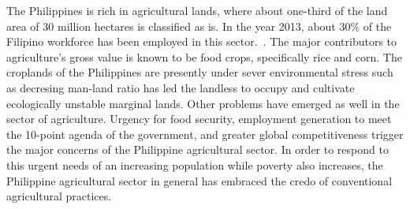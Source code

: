 The Philippines is rich in agricultural lands, where about one-third of the land area of 30 million hectares is classified as is. In the year 2013, about 30\% of the Filipino workforce has been employed in this sector.~\cite{WorldBank}. The major contributors to agriculture's gross value is known to be food crops, specifically rice and corn. The croplands of the Philippines are presently under sever environmental stress such as decresing man-land ratio has led the landless to occupy and cultivate ecologically unstable marginal lands. Other problems have emerged as well in the sector of agriculture. Urgency for food security, employment generation to meet the 10-point agenda of the government, and greater global competitiveness trigger the major concerns of the Philippine agricultural sector. In order to respond to this urgent needs of an increasing population while poverty also increases, the Philippine agricultural sector in general has embraced the credo of conventional agricultural practices.~\cite{Briones}
